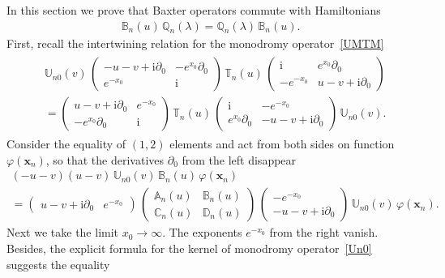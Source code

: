 \documentclass[11pt]{article}
\numberwithin{equation}{section}
\theoremstyle{plain}
\theoremstyle{definition}
\newcommand{\T}{\mathbb{T}}
\newcommand{\A}{\mathbb{A}}
\newcommand{\B}{\mathbb{B}}
\newcommand{\C}{\mathbb{C}}
\newcommand{\D}{\mathbb{D}}
\newcommand{\QQ}{\mathbb{Q}}
\newcommand{\MMO}{\mathbb{U}}
\renewcommand{\phi}{\varphi}
\renewcommand{\imath}{\mathrm{i}}
\begin{document}
In this section we prove that Baxter operators commute with Hamiltonians
\begin{align}
	\B_n(u) \, \QQ_n(\lambda) = \QQ_n(\lambda) \, \B_n(u).
\end{align}
First, recall the intertwining relation for the monodromy operator~\eqref{UMTM}
\begin{align}
	\begin{aligned}
		& \MMO_{n 0}(v)\,
		\left(\begin{array}{cc}
			-u-v+\imath \partial_0 & -e^{x_0}\partial_0 \\[3pt]
			e^{-x_0} & \imath \end{array} \right )\,\T_{n}(u) \,
		\left(\begin{array}{cc}
			\imath & e^{x_0}\partial_0 \\[3pt]
			-e^{-x_0} & u-v+\imath \partial_0 \end{array} \right ) \\[6pt]
		& = \left
		(\begin{array}{cc}
			u-v+\imath \partial_0 & e^{-x_0} \\[3pt]
			-e^{x_0}\partial_0 & \imath \end{array} \right )\,
		\T_{n}(u) \,
		\left(\begin{array}{cc}
			\imath & -e^{-x_0} \\[3pt]
			e^{x_0}\partial_0 & -u-v+\imath \partial_0\end{array} \right )\,
		\MMO_{n 0}(v).
	\end{aligned}
\end{align}
Consider the equality of $(1,2)$ elements and act from both sides on function $\phi(\bm{x}_n)$, so that the derivatives $\partial_0$ from the left disappear
\begin{multline} \label{UB}
(-u-v)(u-v) \, \MMO_{n 0}(v) \, \B_n(u) \, 
\phi(\bm{x}_n) \\[6pt]
= \begin{pmatrix}
u-v+\imath \partial_0 & e^{-x_0} \end{pmatrix} \, 
\begin{pmatrix}
			\A_n(u) & \B_n(u) \\[3pt]
			\C_n(u) & \D_n(u)
		\end{pmatrix} \,
\begin{pmatrix}
-e^{-x_0} \\[3pt]
-u-v+\imath \partial_0 \end{pmatrix} \, 
\MMO_{n 0}(v)\,\phi(\bm{x}_n).
\end{multline}
Next we take the limit $x_0\to \infty$. The exponents $e^{-x_0}$ from the right vanish. Besides, the explicit formula for the kernel of monodromy operator~\eqref{Un0} suggests the equality 
\end{document}
